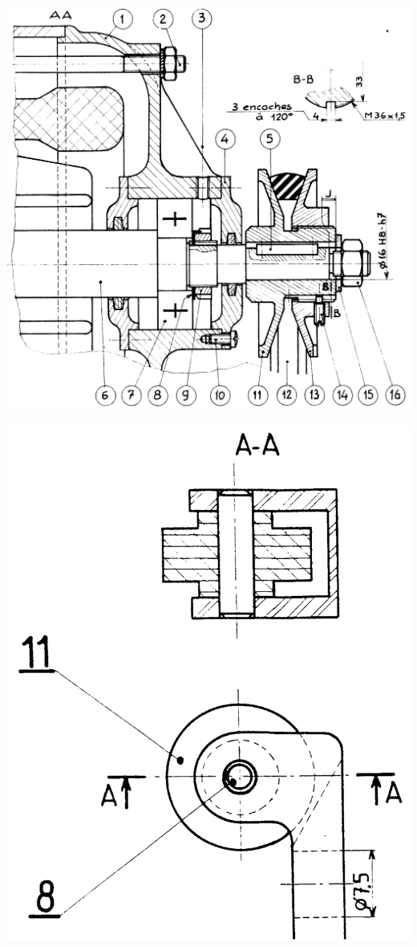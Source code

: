 \documentclass[11pt,oneside]{article}
\begin{document}
\begin{minipage}[c]{.6\linewidth}
\begin{center}
\includegraphics[width=.9\textwidth]{png/fig_01}
\end{center}
 \end{minipage} \hfill
\begin{minipage}[c]{.35\linewidth}
\begin{center}
\includegraphics[width=.8\textwidth]{png/fig_02}
\end{center}
 \end{minipage}
\end{document}
